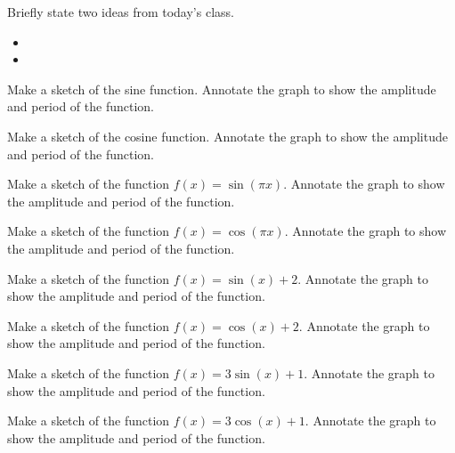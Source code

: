 \postClass

\begin{problem}
\item Briefly state two ideas from today's class.
  \begin{itemize}
  \item 
  \item 
  \end{itemize}
\item Make a sketch of the sine function. Annotate the graph to show
  the amplitude and period of the function.
\item Make a sketch of the cosine function. Annotate the graph to show
  the amplitude and period of the function.
\item Make a sketch of the function $f(x)=\sin(\pi x)$. Annotate the
  graph to show the amplitude and period of the function.
\item Make a sketch of the function $f(x)=\cos(\pi x)$. Annotate the
  graph to show the amplitude and period of the function.
\item Make a sketch of the function $f(x)=\sin(x)+2$. Annotate the
  graph to show the amplitude and period of the function.
\item Make a sketch of the function $f(x)=\cos(x)+2$. Annotate the
  graph to show the amplitude and period of the function.
\item Make a sketch of the function $f(x)=3\sin(x)+1$. Annotate the
  graph to show the amplitude and period of the function.
\item Make a sketch of the function $f(x)=3\cos(x)+1$. Annotate the
  graph to show the amplitude and period of the function.
\end{problem}



\newcommand{\unitcircleAxes}[1]{
  \draw[step=0.5cm,gray!30,very thin] (-1.1,-1.1) grid (1.1,1.1);
  \draw (-1.1,0) -- (1.1,0);
  \draw (0,-1.1) -- (0,1.1); 
  \draw (0,0) circle [radius=1cm];
  \filldraw [black] ({#1}:1cm) circle [radius=0.025cm];
  \draw (0,1.2cm) node {$y$};
  \draw (1.2cm,0) node {$x$};
}

\newcommand{\triangleUnitCircle}[2]{
    \draw[green,thick] (.2cm,0cm) arc [start angle=0, end angle={#1},radius=.2cm]; 
    \draw[red!80,thick] ({#1}:1cm) -- ++(0,{#2}); 
    \draw[blue!80,thick] (0,0) -- ({#1}:1cm); 
}

\newcommand{\labelXAxis}[1]{
    \foreach \x in {-1,-0.5,0.5,1} {
      \draw (\x cm,1pt) -- (\x cm,-1pt);
      \draw (\x cm,#1) node[anchor=north,fill=white] {$\x$};
    }
}

